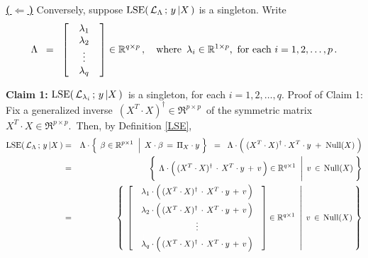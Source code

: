 \vskip 0.5cm\noindent
\underline{\textbf{(\,$\Longleftarrow$\,)}}\quad
Conversely, suppose $\lse\!\left(\,\mathcal{L}_{\Lambda} \,;\, y\,\vert X\,\right)$ is a singleton.
Write
\begin{equation*}
\Lambda
\;\; = \;\;
	\left[\;\;\begin{array}{c}
	\lambda_{1} \\ \lambda_{2} \\ \vdots \\ \lambda_{q}
	\end{array}\;\;\right]
	\in\Re^{q \times p}\,,
	\quad\textnormal{where \,$\lambda_{i} \in \Re^{1 \times p}$,\, for each $i = 1,2,\ldots,p$}\,.
\end{equation*}

\vskip 0.5cm
\noindent
\textbf{Claim 1:}\quad
$\lse\!\left(\,\mathcal{L}_{\lambda_{i}} \,;\, y\,\vert X\,\right)$\, is a singleton, for each $i = 1,2,\ldots,q$.
\vskip 0.2cm
\noindent
Proof of Claim 1:\quad
Fix a generalized inverse \,$(X^{T} \cdot X)^{\dagger} \in \Re^{p \times p}$\, of the symmetric
matrix \,$X^{T} \cdot X \in \Re^{p \times p}$.\,
Then, by Definition \ref{LSE},
\begin{eqnarray*}
\lse\!\left(\,\mathcal{L}_{\Lambda} \,;\, y\,\vert X\,\right)
&=&
	\Lambda\cdot
	\left\{\;
		\left.
		\overset{{\color{white}.}}{\beta}
		\in\Re^{p \times 1}
		\;\;\right\vert\;
		X \cdot \beta \,=\, \Pi_{X}\cdot y
	\;\right\}
\;\;=\;\;
	\Lambda \cdot \left(\;(X^{T} \cdot \overset{{\color{white}.}}{X})^{\dagger} \cdot X^{T} \cdot y \; + \; \Null(X) \;\right)
\\
&=&
	\left\{\;
		\left.
		\overset{{\color{white}\vert}}{\Lambda}
		\cdot
		\left(\,(X^{T} \cdot X)^{\dagger} \overset{{\color{white}+}}{\cdot} X^{T} \cdot y \, + \, v \,\right)
		\in\Re^{q \times 1}
		\;\;\right\vert\;
		v \,\in\, \Null(X)
	\;\right\}
\\
&=&
	\left\{\;
		\left.
		\left[\;\;\begin{array}{c}
			\lambda_{1} \cdot \left(\,(X^{T} \cdot X)^{\dagger} \overset{{\color{white}+}}{\cdot} X^{T} \cdot y \, + \, v \,\right)
			\\
			\overset{{\color{white}\vert}}{\lambda}_{2} \cdot \left(\,
				(X^{T} \cdot X)^{\dagger} \overset{{\color{white}+}}{\cdot} X^{T} \cdot y \, + \, v
				\,\right)
			\\
			\vdots
			\\
			\overset{{\color{white}\vert}}{\lambda}_{q} \cdot \left(\,
				(X^{T} \cdot X)^{\dagger} \overset{{\color{white}+}}{\cdot} X^{T} \cdot y \, + \, v
				\,\right)
		\end{array}\;\;\right]
		\in\Re^{q \times 1}
		\;\;\right\vert\;
		v \,\in\, \Null(X)
	\;\right\}
\end{eqnarray*}
